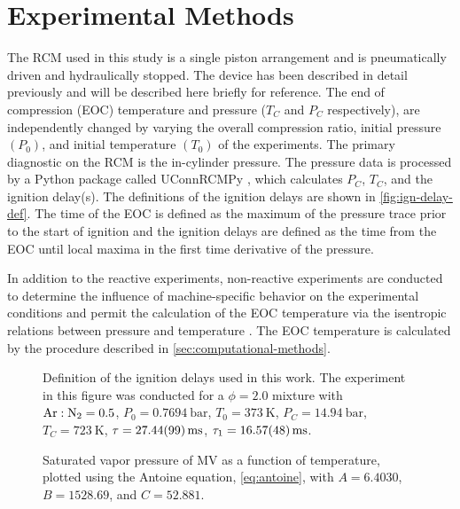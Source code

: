 \documentclass[12pt]{../ussci}
\begin{document}
\section{Experimental Methods}\label{sec:experimental-methods}

The RCM used in this study is a single piston arrangement and is pneumatically
driven and hydraulically stopped. The device has been described in detail
previously \autocite{Mittal2007a} and will be described here briefly for
reference. The end of compression (EOC) temperature and pressure (\(T_C\) and
\(P_C\) respectively), are independently changed by varying the overall
compression ratio, initial pressure \((P_0)\), and initial temperature \((T_0)\)
of the experiments. The primary diagnostic on the RCM is the in-cylinder
pressure. The pressure data is processed by a Python package called UConnRCMPy
\autocite{uconnrcmpy}, which calculates \(P_C\), \(T_C\), and the ignition
delay(s). The definitions of the ignition delays are shown in
\cref{fig:ign-delay-def}. The time of the EOC is defined as the maximum of the
pressure trace prior to the start of ignition and the ignition delays are
defined as the time from the EOC until local maxima in the first time derivative
of the pressure.

In addition to the reactive experiments, non-reactive experiments are conducted
to determine the influence of machine-specific behavior on the experimental
conditions and permit the calculation of the EOC temperature via the isentropic
relations between pressure and temperature \autocite{Lee1998}. The EOC
temperature is calculated by the procedure described in
\cref{sec:computational-methods}.

\begin{figure}[htb]
    \begin{minipage}[t]{0.48\textwidth}
        \centering
        \resizebox{\linewidth}{!}{}
        \caption{Definition of the ignition delays used in this work. The
        experiment in this figure was conducted for a \(\phi=2.0\) mixture with
        \mbox{\(\ce{Ar}:\ce{N2}=0.5\)}, \(P_0=\SI{0.7694}{\bar}\),
        \(T_0=\SI{373}{\K}\), \(P_C=\SI{14.94}{\bar}\), \(T_C=\SI{723}{\K}\),
        \(\tau=\SI{27.44\pm0.99}{\ms}\), \(\tau_1=\SI{16.57\pm0.48}{\ms}\).}
        \label{fig:ign-delay-def}
    \end{minipage}\hfill%
    \begin{minipage}[t]{0.48\textwidth}
        \centering
        \resizebox{\linewidth}{!}{}
        \caption{Saturated vapor pressure of MV as a function of temperature,
        plotted using the Antoine equation, \cref{eq:antoine}, with
        \(A=6.4030\), \(B=1528.69\), and \(C=52.881\).}
        \label{fig:vapor-pressure}
    \end{minipage}
\end{figure}
\end{document}
